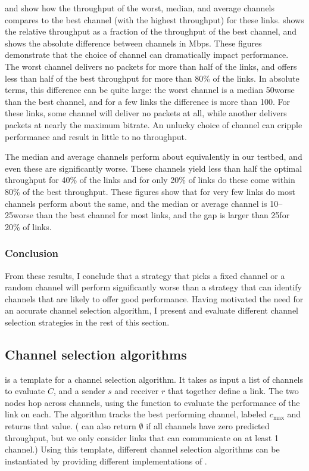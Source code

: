  and  show how the throughput of the worst, median, and average channels compares to the best channel (with the highest throughput) for these links.  shows the relative throughput as a fraction of the throughput of the best channel, and  shows the absolute difference between channels in Mbps. These figures demonstrate that the choice of channel can dramatically impact performance. The worst channel delivers no packets for more than half of the links, and offers less than half of the best throughput for more than 80\% of the links. In absolute terms, this difference can be quite large: the worst channel is a median 50\Mbps worse than the best channel, and for a few links the difference is more than 100\Mbps. For these links, some channel will deliver no packets at all, while another delivers packets at nearly the maximum bitrate. An unlucky choice of channel can cripple performance and result in little to no throughput.

The median and average channels perform about equivalently in our testbed, and even these are significantly worse. These channels yield less than half the optimal throughput for 40\% of the links and for only 20\% of links do these come within 80\% of the best throughput. These figures show that for very few links do most channels perform about the same, and the median or average channel is 10--25\Mbps worse than the best channel for most links, and the gap is larger than 25\Mbps for 20\% of links.

\subsubsection{Conclusion}
From these results, I conclude that a strategy that picks a fixed channel or a random channel will perform significantly worse than a strategy that can identify channels that are likely to offer good performance. Having motivated the need for an accurate channel selection algorithm, I present and evaluate different channel selection strategies in the rest of this section.

\subsection{Channel selection algorithms}
 is a template for a channel selection algorithm. It takes as input a list of channels to evaluate $C$, and a sender $s$ and receiver $r$ that together define a link. The two nodes hop across channels, using the  function to evaluate the performance of the link on each. The algorithm tracks the best performing channel, labeled $c_{\max}$ and returns that value. ( can also return $\emptyset$ if all channels have zero predicted throughput, but we only consider links that can communicate on at least 1 channel.) Using this template, different channel selection algorithms can be instantiated by providing different implementations of .

